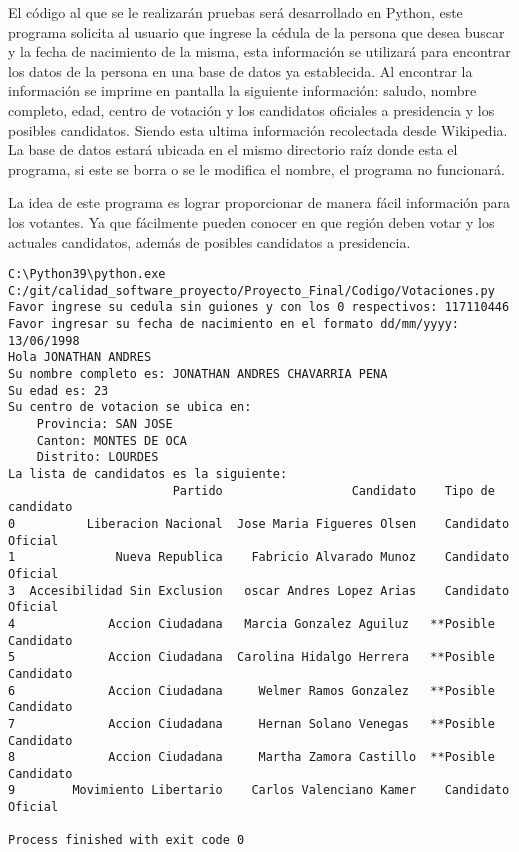 \documentclass[conference]{IEEEtran}
\begin{document}
El código al que se le realizarán pruebas será desarrollado en Python, este programa solicita al usuario que ingrese la cédula de la persona que desea buscar y la fecha de nacimiento de la misma, esta información se utilizará para encontrar los datos de la persona en una base de datos ya establecida. Al encontrar la información se imprime en pantalla la siguiente información: saludo, nombre completo, edad, centro de votación y los candidatos oficiales a presidencia y los posibles candidatos. Siendo esta ultima información recolectada desde Wikipedia. La base de datos estará ubicada en el mismo directorio raíz donde esta el programa, si este se borra o se le modifica el nombre, el programa no funcionará.

La idea de este programa es lograr proporcionar de manera fácil información para los votantes. Ya que fácilmente pueden conocer en que región deben votar y los actuales candidatos, además de posibles candidatos a presidencia.


\begin{lstlisting}[style=CMD_small]
C:\Python39\python.exe C:/git/calidad_software_proyecto/Proyecto_Final/Codigo/Votaciones.py
Favor ingrese su cedula sin guiones y con los 0 respectivos: 117110446
Favor ingresar su fecha de nacimiento en el formato dd/mm/yyyy: 13/06/1998
Hola JONATHAN ANDRES
Su nombre completo es: JONATHAN ANDRES CHAVARRIA PENA
Su edad es: 23
Su centro de votacion se ubica en:
	Provincia: SAN JOSE
	Canton: MONTES DE OCA
	Distrito: LOURDES
La lista de candidatos es la siguiente:
                       Partido                  Candidato    Tipo de candidato
0          Liberacion Nacional  Jose Maria Figueres Olsen    Candidato Oficial
1              Nueva Republica    Fabricio Alvarado Munoz    Candidato Oficial
3  Accesibilidad Sin Exclusion   oscar Andres Lopez Arias    Candidato Oficial
4             Accion Ciudadana   Marcia Gonzalez Aguiluz   **Posible Candidato
5             Accion Ciudadana  Carolina Hidalgo Herrera   **Posible Candidato
6             Accion Ciudadana     Welmer Ramos Gonzalez   **Posible Candidato
7             Accion Ciudadana     Hernan Solano Venegas   **Posible Candidato
8             Accion Ciudadana     Martha Zamora Castillo  **Posible Candidato
9        Movimiento Libertario    Carlos Valenciano Kamer    Candidato Oficial

Process finished with exit code 0
\end{lstlisting}

\end{document}
